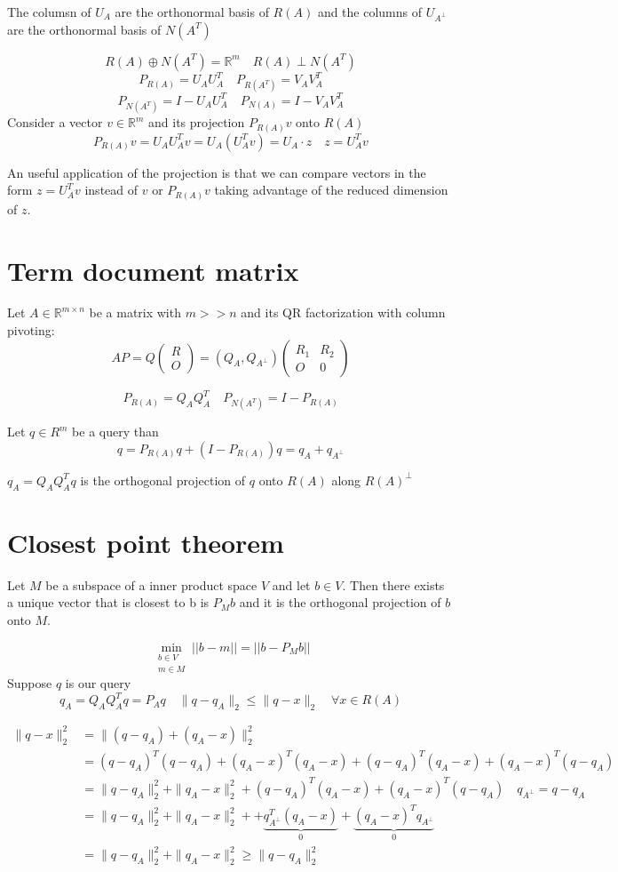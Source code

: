 The columsn of $U_A$ are the orthonormal basis of $R(A)$
and the columns of $U_{A^{\perp}}$ are the orthonormal basis of $N(A^T)$

$$
R(A) \oplus N(A^T) = \mathbb{R}^m \quad R(A) \perp N(A^T)
$$ $$
P_{R(A)} = U_AU_A^T \quad P_{R(A^T)} = V_AV_A^T
$$ $$
P_{N(A^T)} = I - U_AU_A^T \quad P_{N(A)} = I - V_AV_A^T
$$
Consider a vector $v \in \mathbb{R}^m$ and its projection $P_{R(A)}v$ onto $R(A)$
$$
P_{R(A)}v = U_AU_A^Tv = U_A(U_A^Tv) = U_A \cdot z \quad z = U_A^Tv
$$

An useful application of the projection is that we can compare vectors in the form $z = U_A^Tv$ instead of $v$ or $P_{R(A)}v$
taking advantage of the reduced dimension of $z$.

\section{Term document matrix}
Let $A \in \mathbb{R}^{m \times n}$ be a matrix with $m >> n$ and its QR factorization with column pivoting:
$$ AP = Q\begin{pmatrix}
    R \\ O
\end{pmatrix} = (Q_A, Q_{A^{\perp}})\begin{pmatrix}
    R_1 & R_2 \\ O & 0
\end{pmatrix}
$$

$$ P_{R(A)} = Q_AQ_A^T \quad P_{N(A^T)} = I - P_{R(A)}$$

Let $q \in R^{m}$ be a query than $$q = P_{R(A)}q + (I-P_{R(A)})q = q_A + q_{A^\perp}$$

$ q_A = Q_AQ_A^Tq $ is the orthogonal projection of $q$ onto $R(A)$ along $R(A)^{\perp}$

\section{Closest point theorem}
Let $M$ be a subspace of a inner product space $V$ and let $b \in V$.
Then there exists a unique vector that is closest to b is $P_Mb$ and it is the orthogonal projection of $b$ onto $M$.

$$ \min_{\substack{b \in V \\ m \in M}} ||b - m|| = ||b - P_Mb|| $$
Suppose $q$ is our query
$$ q_A = Q_AQ_A^Tq = P_A q  \quad \|q - q_A \|_2 \leq \|q - x \|_2 \quad \forall x \in R(A) $$

$$
\begin{aligned}
    \|q - x \|_2^2 &= \|(q - q_A) + (q_A - x) \|_2^2 \\
    &= (q - q_A)^T(q - q_A) + (q_A - x)^T(q_A - x) + (q - q_A)^T(q_A - x) + (q_A - x)^T(q - q_A)\\
    &= \|q - q_A \|_2^2 + \|q_A - x \|_2^2 + (q - q_A)^T(q_A - x) + (q_A - x)^T(q - q_A) \quad q_{A^{\perp}} = q - q_A \\
    &= \|q - q_A \|_2^2 + \|q_A - x \|_2^2 + + \underbrace{q_{A^\perp}^T(q_A - x)}_{0} + \underbrace{(q_A - x)^Tq_{A^\perp}}_{0}\\
    &= \|q - q_A \|_2^2 + \|q_A - x \|_2^2 \geq \|q - q_A \|_2^2
\end{aligned}
$$

